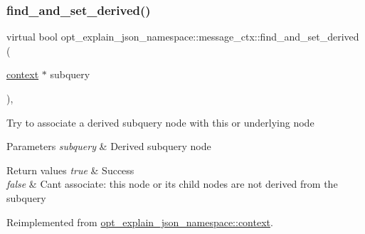 \mbox{\label{classopt__explain__json__namespace_1_1message__ctx_a5929254898f69f30b19b4f176a71e3a1}} 
\subsubsection{\texorpdfstring{find\+\_\+and\+\_\+set\+\_\+derived()}{find\_and\_set\_derived()}}
{\footnotesize\ttfamily virtual bool opt\+\_\+explain\+\_\+json\+\_\+namespace\+::message\+\_\+ctx\+::find\+\_\+and\+\_\+set\+\_\+derived (\begin{DoxyParamCaption}\item[{\mbox{\hyperlink{classopt__explain__json__namespace_1_1context}{context}} $\ast$}]{subquery }\end{DoxyParamCaption})\hspace{0.3cm}{\ttfamily [inline]}, {\ttfamily [virtual]}}

Try to associate a derived subquery node with this or underlying node


\begin{DoxyParams}{Parameters}
{\em subquery} & Derived subquery node\\
\hline
\end{DoxyParams}

\begin{DoxyRetVals}{Return values}
{\em true} & Success \\
\hline
{\em false} & Can\textquotesingle{}t associate\+: this node or its child nodes are not derived from the subquery \\
\hline
\end{DoxyRetVals}


Reimplemented from \mbox{\hyperlink{classopt__explain__json__namespace_1_1context_afe66d6ec1a0f56114bc2b493b084c1a0}{opt\+\_\+explain\+\_\+json\+\_\+namespace\+::context}}.

\mbox{\label{classopt__explain__json__namespace_1_1message__ctx_aaad801a247c7103078a058661f4084ce}} 

